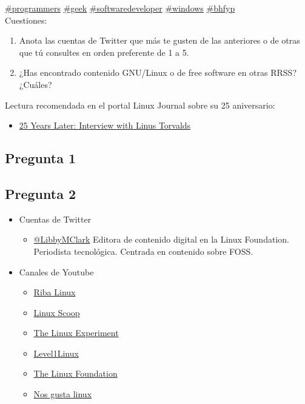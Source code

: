 \begin{center}
{{    \href{https://twitter.com/hashtag/programmers}{\#programmers}
    \href{https://twitter.com/hashtag/geek}{\#geek}
    \href{https://twitter.com/hashtag/softwaredeveloper}{\#softwaredeveloper}
    \href{https://twitter.com/hashtag/windows}{\#windows}
    \href{https://twitter.com/hashtag/bhfyp}{\#bhfyp}
    \\
    Cuestiones:
    \begin{enumerate}
    \item Anota las cuentas de Twitter que más te gusten de las anteriores o de otras que tú consultes en orden preferente de 1 a 5.
    \item ¿Has encontrado contenido GNU/Linux o de free software en otras RRSS? ¿Cuáles?
    \end{enumerate}
    Lectura recomendada en el portal Linux Journal sobre su 25 aniversario:
    \begin{itemize}
        \item \href{https://www.linuxjournal.com/content/25-years-later-interview-linus-torvalds}{25 Years Later: Interview with Linus Torvalds}
    \end{itemize}
    }}
\end{center}

\subsection{Pregunta 1}

\subsection{Pregunta 2}

\begin{itemize}
    \item Cuentas de Twitter
    \begin{itemize}
        \item \href{https://twitter.com/LibbyMClark}{@LibbyMClark} Editora de contenido digital en la Linux Foundation. Periodista tecnológica. Centrada en contenido sobre FOSS.
    \end{itemize}
    \item Canales de Youtube
    \begin{itemize}
        \item \href{https://www.youtube.com/user/TheRibalinux/videos}{Riba Linux}
        \item \href{https://www.youtube.com/user/linuxscoop}{Linux Scoop}
        \item \href{https://www.youtube.com/channel/UC5UAwBUum7CPN5buc-_N1Fw}{The Linux Experiment}
        \item \href{https://www.youtube.com/channel/UCOWcZ6Wicl-1N34H0zZe38w}{Level1Linux}
        \item \href{https://www.youtube.com/user/TheLinuxFoundation}{The Linux Foundation}
        \item \href{https://www.youtube.com/user/nosgustalinux}{Nos gusta linux}
    \end{itemize}
\end{itemize}